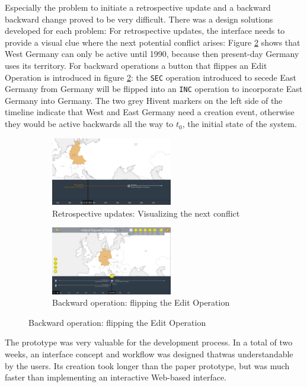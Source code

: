 Especially the problem to initiate a retrospective update and a backward backward change proved to be very difficult. There was a design solutions developed for each problem: For retrospective updates, the interface needs to provide a visual clue where the next potential conflict arises: Figure \ref{sfig:backward_change} shows that West Germany can only be active until 1990, because then present-day Germany uses its territory. For backward operations a button that flippes an Edit Operation  is introduced in figure \ref{sfig:backward_change}: the \texttt{SEC} operation introduced to secede East Germany from Germany will be flipped into an \texttt{INC} operation to incorporate East Germany into Germany. The two grey Hivent markers on the left side of the timeline indicate that West and East Germany need a creation event, otherwise they would be active backwards all the way to $t_0$, the initial state of the system.

\begin{figure}[ht]
\centering
\begin{subfigure}[b]{.5\textwidth}
  \centering
  \includegraphics[width=200px]{graphics/development/user_interface_design_process/retrospective_update.png}
  \caption{Retrospective updates: Visualizing the next conflict}
  \label{sfig:retrospective_update}
\end{subfigure}%
\begin{subfigure}[b]{.5\textwidth}
  \centering
  \includegraphics[width=200px]{graphics/development/user_interface_design_process/backward_change.png}
  \caption{Backward operation: flipping the Edit Operation}
  \label{sfig:backward_change}
\end{subfigure}
\label{fig:backward_change}
\end{figure}

The prototype was very valuable for the development process. In a total of two weeks, an interface concept and workflow was designed thatwas understandable by the users. Its creation took longer than the paper prototype, but was much faster than implementing an interactive Web-based interface.


